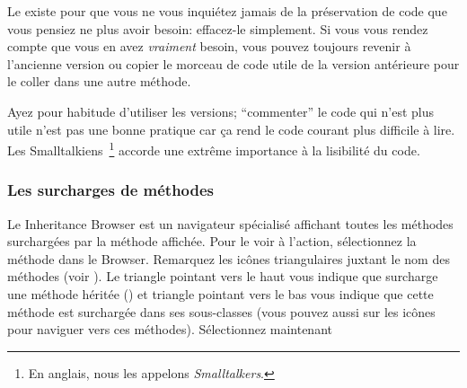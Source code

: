 \documentclass[a4paper,10pt,twoside]{book}
\begin{document}
Le  existe pour que vous ne vous inquiétez jamais
de la préservation de code que vous pensiez ne plus avoir besoin: effacez-le simplement. 
Si vous vous rendez compte que vous en avez \emph{vraiment} besoin, 
vous pouvez toujours revenir à l'ancienne version ou copier le morceau de 
code utile de la version antérieure pour le coller dans une autre méthode.

Ayez pour habitude d'utiliser les versions; ``commenter'' le code qui n'est 
plus utile n'est pas une bonne pratique car ça rend le code courant plus difficile à lire. 
Les Smalltalkiens~\footnote{En anglais, nous les appelons
 \emph{Smalltalkers}.} accorde une extrême importance à la lisibilité du code.


\subsubsection{Les surcharges de méthodes}

Le Inheritance Browser est un navigateur spécialisé
affichant toutes les méthodes surchargées par la méthode affichée.
Pour le voir à l'action, sélectionnez la méthode
 dans le Browser.
Remarquez les icônes triangulaires juxtant le nom des méthodes (voir ).
Le triangle pointant vers le haut vous indique que 
 surcharge une méthode héritée
 (\ie {}) et triangle pointant vers le bas vous
 indique que cette méthode est surchargée dans ses sous-classes (vous
 pouvez aussi \click sur les icônes pour naviguer vers ces méthodes).
Sélectionnez maintenant 
\end{document}
